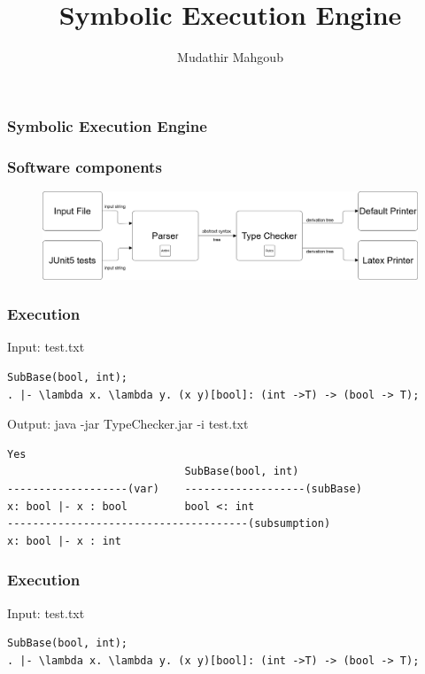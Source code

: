 \documentclass{beamer}
\title{Symbolic Execution Engine}
\author{Mudathir Mahgoub}
\begin{document}
 
\frame{\titlepage}
 
\begin{frame}
\frametitle{Symbolic Execution Engine}

\end{frame}

\begin{frame}
\frametitle{Software components}
\begin{figure}
 \centering
 \includegraphics[scale=.18,keepaspectratio=true]{./engine.png}
\end{figure}
\end{frame}


\begin{frame}[fragile]
\frametitle{Execution}
\scriptsize

\begin{block}{Input: test.txt}
\begin{lstlisting}
SubBase(bool, int);
. |- \lambda x. \lambda y. (x y)[bool]: (int ->T) -> (bool -> T);
\end{lstlisting}
\end{block}

\begin{block} {Output: java -jar TypeChecker.jar -i test.txt}
\begin{lstlisting}
Yes
                        	SubBase(bool, int)
-------------------(var)	-------------------(subBase)
x: bool |- x : bool			bool <: int
--------------------------------------(subsumption)
x: bool |- x : int
\end{lstlisting}
\end{block}

\end{frame}


\begin{frame}[fragile]
\frametitle{Execution}
\scriptsize

\begin{block}{Input: test.txt}
\begin{lstlisting}
SubBase(bool, int);
. |- \lambda x. \lambda y. (x y)[bool]: (int ->T) -> (bool -> T);
\end{lstlisting}
\end{block}

\end{frame}
\end{document}
